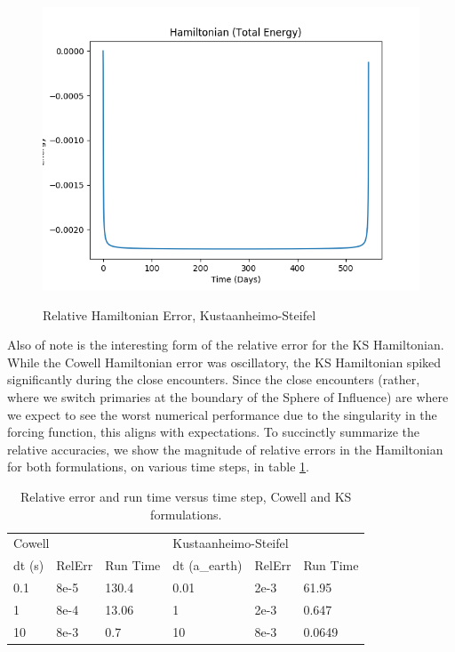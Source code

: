 \documentclass[11pt,twoside,letterpaper]{article}
\begin{document}
  \begin{figure}
    \caption{Relative Hamiltonian Error, Kustaanheimo-Steifel}
    \centering
    \includegraphics[width=\textwidth]{HamiltonianKS}
    \label{ksham}
  \end{figure}
  
  Also of note is the interesting form of the relative error for the
  KS Hamiltonian. While the Cowell Hamiltonian error was oscillatory,
  the KS Hamiltonian spiked significantly during the close
  encounters. Since the close encounters (rather, where we switch
  primaries at the boundary of the Sphere of Influence) are where we
  expect to see the worst numerical performance due to the singularity
  in the forcing function, this aligns with expectations. To
  succinctly summarize the relative accuracies, we show the magnitude
  of relative errors in the Hamiltonian for both formulations, on
  various time steps, in table \ref{resultsTab}.

  \begin{table}[] \label{resultsTab}
    \centering
    \begin{tabular}{llllll}
      \multicolumn{3}{l}{Cowell} & \multicolumn{3}{l}{Kustaanheimo-Steifel} \\
      dt (s) & RelErr & Run Time & dt (a\_earth) & RelErr & Run Time \\ \hline
      \multicolumn{1}{|l|}{0.1} & \multicolumn{1}{l|}{8e-5} & \multicolumn{1}{l|}{130.4} & \multicolumn{1}{l|}{0.01} & \multicolumn{1}{l|}{2e-3} & \multicolumn{1}{l|}{61.95} \\ \hline
      \multicolumn{1}{|l|}{1} & \multicolumn{1}{l|}{8e-4} & \multicolumn{1}{l|}{13.06} & \multicolumn{1}{l|}{1} & \multicolumn{1}{l|}{2e-3} & \multicolumn{1}{l|}{0.647} \\ \hline
      \multicolumn{1}{|l|}{10} & \multicolumn{1}{l|}{8e-3} & \multicolumn{1}{l|}{0.7} & \multicolumn{1}{l|}{10} & \multicolumn{1}{l|}{8e-3} & \multicolumn{1}{l|}{0.0649} \\ \hline
    \end{tabular}
    \caption{Relative error and run time versus time step, Cowell and KS formulations.}
  \end{table}
  
\end{document}
